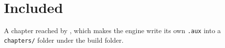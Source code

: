 \chapter{Included}
A chapter reached by \verb||, which makes the engine write its own \texttt{.aux}
into a \texttt{chapters/} folder under the build folder.
